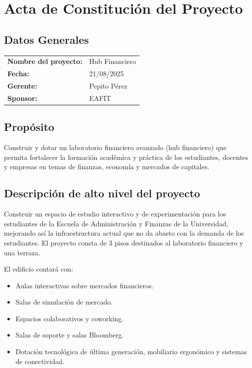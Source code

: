 \section{Acta de Constitución del Proyecto}

\subsection{Datos Generales}

\begin{tabularx}{\textwidth}{@{}lX@{}}
\textbf{Nombre del proyecto:} & Hub Financiero \\
\textbf{Fecha:} & 21/08/2025 \\
\textbf{Gerente:} & Pepito Pérez \\
\textbf{Sponsor:} & EAFIT \\
\end{tabularx}

\subsection{Propósito}

Construir y dotar un laboratorio financiero avanzado (hub financiero) que permita fortalecer la formación académica y práctica de los estudiantes, docentes y empresas en temas de finanzas, economía y mercados de capitales.

\subsection{Descripción de alto nivel del proyecto}

Construir un espacio de estudio interactivo y de experimentación para los estudiantes de la Escuela de Administración y Finanzas de la Universidad, mejorando así la infraestructura actual que no da abasto con la demanda de los estudiantes. El proyecto consta de 3 pisos destinados al laboratorio financiero y una terraza.  

El edificio contará con:
\begin{itemize}
    \item Aulas interactivas sobre mercados financieros.
    \item Salas de simulación de mercado.
    \item Espacios colaborativos y coworking.
    \item Salas de soporte y salas Bloomberg.
    \item Dotación tecnológica de última generación, mobiliario ergonómico y sistemas de conectividad.
\end{itemize}

